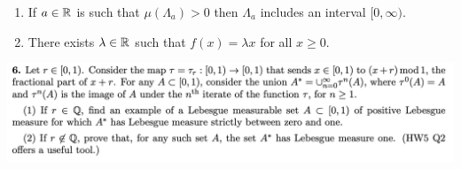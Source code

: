 \begin{enumerate}
\begin{proof}
    We must use: additivity of $f$, positive measure of $\{x ~:~ g_a(x) \geq 0\}$.

    \begin{align*}
      g_a\Big(\sum_{x \in \Lambda_a} x\Big) = \sum_{x \in \Lambda_a} g_a(x) \geq 0.
    \end{align*}

    Note that for all $n \in \N$ we have $f(nx) = f(x + x + \cdots + x) = nf(x)$. Therefore
    \begin{align*}
      g_a(nx)
      &= f(nx) - anx \\
      &= n(f(x) - ax) \\
      &= ng_a(x).
    \end{align*}
    \begin{align*}
      g_a(x + x')
      &= f(x + x') - a(x + x') \\
      &= g_{a}(x) + g_{a}(x').
    \end{align*}
    Since $\mu(\Lambda_a) > 0$ there exist $x$ and $x'$ such that $g_a(x) \geq 0$ and $g_a(x') \geq 0$
    and $x \neq x'$.

    Therefore $g_a(x + x') \geq 0$.

    So what we need to do is show that some interval $[b, \infty)$ is ``spanned​'' by $x, x'$ values in $\Lambda_a$.



  \end{proof}

\item
  \begin{claim*}
    If $a \in \mathbb{R}$ is such that $\mu(\Lambda_a) > 0$ then $\Lambda_a$ includes an interval $[0, \infty)$.
  \end{claim*}

\item
  \begin{claim*}
    There exists $\lambda \in \mathbb{R}$ such that $f(x) = \lambda x$ for all $x \geq 0$.
  \end{claim*}


\end{enumerate}


\newpage
\begin{mdframed}
\includegraphics[width=400pt]{img/analysis--berkeley-202a-hw06-9bc5.png}
\end{mdframed}

